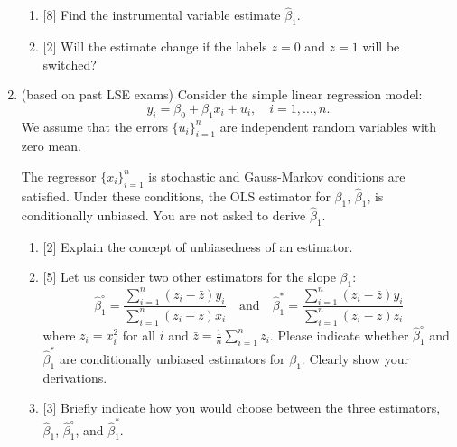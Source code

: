 \documentclass[12pt]{article}
\newcommand{\hb}{\hat{\beta}}
\begin{document}
\begin{enumerate}

    \begin{enumerate}
        \item {[8]} Find the instrumental variable estimate $\hb_1$.
        \item {[2]} Will the estimate change if the labels $z = 0$ and $z = 1$ will be switched?
    \end{enumerate}
    

    \item (based on past LSE exams) Consider the simple linear regression model:
    \[
    y_i = \beta_0 + \beta_1 x_i + u_i, \quad i = 1, \dots, n.
    \]
    We assume that the errors $\{u_i\}_{i=1}^n$ are independent random variables with zero mean. 
    
    The regressor $\{x_i\}_{i=1}^n$ is stochastic and Gauss-Markov conditions are satisfied.
    Under these conditions, the OLS estimator for $\beta_1$, $\hb_1$, is conditionally unbiased. 
    You are not asked to derive $\hb_1$.
    
    \begin{enumerate}
        \item {[2]} Explain the concept of unbiasedness of an estimator. 
    
        \item {[5]} Let us consider two other estimators for the slope \(\beta_1\):
        \[
        \hat{\beta}_1^\circ = \frac{\sum_{i=1}^n (z_i - \bar{z}) y_i}{\sum_{i=1}^n (z_i - \bar{z}) x_i} \quad \text{and} \quad
        \hat{\beta}_1^* = \frac{\sum_{i=1}^n (z_i - \bar{z}) y_i}{\sum_{i=1}^n (z_i - \bar{z}) z_i}
        \]
        where \(z_i = x_i^2\) for all \(i\) and \(\bar{z} = \frac{1}{n} \sum_{i=1}^n z_i\). 
        Please indicate whether \(\hat{\beta}_1^\circ\) and \(\hat{\beta}_1^*\) are conditionally unbiased estimators for \(\beta_1\). 
        Clearly show your derivations. 
    
        \item {[3]} Briefly indicate how you would choose between the three estimators, \(\hat{\beta}_1\), \(\hat{\beta}_1^\circ\), and \(\hat{\beta}_1^*\). 
    \end{enumerate}

\end{enumerate}
\end{document}
